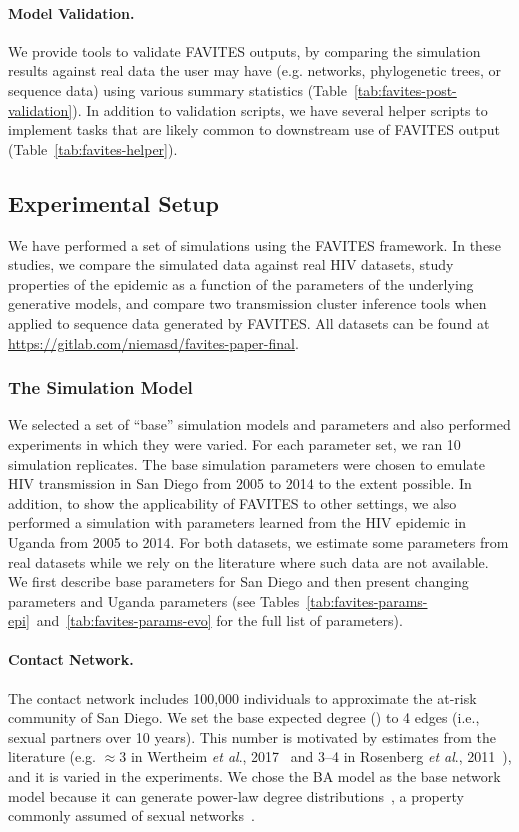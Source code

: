 \paragraph{Model Validation.} We provide tools to validate FAVITES outputs, by comparing the simulation results against real data the user may have (e.g. networks, phylogenetic trees, or sequence data) using various summary statistics (Table~\ref{tab:favites-post-validation}). In addition to validation scripts, we have several helper scripts to implement tasks that are likely common to downstream use of FAVITES output (Table~\ref{tab:favites-helper}).

\subsection{Experimental Setup}
We have performed a set of simulations using the FAVITES framework. In these studies,  we compare the simulated data against real \gls{HIV} datasets, study properties of the epidemic as a function of the parameters of the underlying generative models, and compare two transmission cluster inference tools when applied to sequence data generated by FAVITES. All datasets can be found at \url{https://gitlab.com/niemasd/favites-paper-final}.

\subsubsection{The Simulation Model}\label{sec:favites-default-params}
We selected a set of ``base'' simulation models and parameters and also performed experiments in which they were varied. For each parameter set, we ran 10 simulation replicates. The base simulation parameters were chosen to emulate \gls{HIV} transmission in San Diego from 2005 to 2014 to the extent possible. In addition, to show the applicability of FAVITES to other settings, we also performed a simulation with parameters learned from the \gls{HIV} epidemic in Uganda from 2005 to 2014. For both datasets, we estimate some parameters from real datasets while we rely on the literature where such data are not available.  We first describe base parameters for San Diego and then present changing parameters and Uganda parameters (see Tables~\ref{tab:favites-params-epi}~and~\ref{tab:favites-params-evo} for the full list of parameters).

\paragraph{Contact Network.} The contact network includes 100,000 individuals  to approximate the at-risk community of San Diego. We set the base expected degree (\ED) to 4 edges (i.e., sexual partners over 10 years). This number is motivated by estimates from the literature (e.g. $\approx$3 in Wertheim \textit{et al}., 2017~\cite{Wertheim2017} and 3--4 in Rosenberg \textit{et al}., 2011~\cite{Rosenberg2011}), and it is varied in the experiments. We chose the \gls{BA} model as the base network model because it can generate power-law degree distributions~\cite{Barabasi1999}, a property commonly assumed of sexual networks~\cite{Hamilton2008}.

